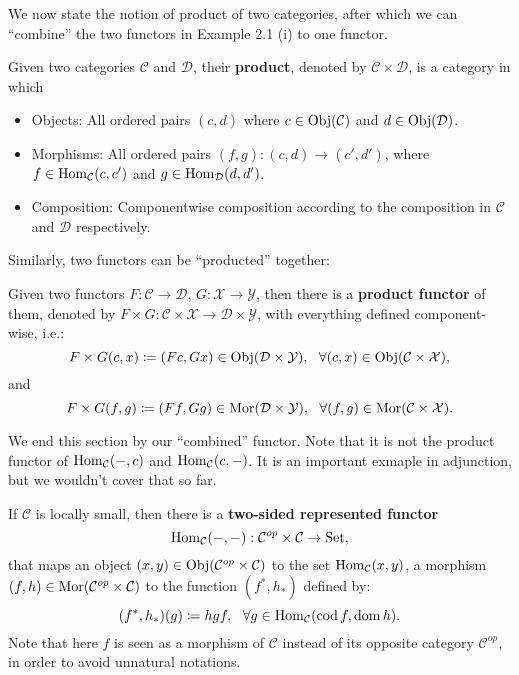 	We now state the notion of product of two categories, after which we can ``combine'' the two functors in Example 2.1 (i) to one functor.
	\begin{definition}
	Given two categories $\mathcal{C}$ and $\mathcal{D}$, their \textbf{product}, denoted by $\mathcal{C}\times\mathcal{D}$, is a category in which
	\begin{itemize}
		\item Objects: All ordered pairs $(c,d)$ where $c\in\operatorname{Obj}(\mathcal{C})$ and $d\in\operatorname{Obj}(\mathcal{D})$.
		\item Morphisms: All ordered pairs $(f,g):(c,d)\to (c',d')$, where $f\in\operatorname{Hom}_\mathcal{C}(c,c')$ and $g\in\operatorname{Hom}_\mathcal{D}(d,d')$.
		\item Composition: Componentwise composition according to the composition in $\mathcal{C}$ and $\mathcal{D}$ respectively.
	\end{itemize}
	\end{definition} 
	Similarly, two functors can be ``producted'' together:
	\begin{definition}
	Given two functors $F:\mathcal{C}\to \mathcal{D}$, $G:\mathcal{X}\to\mathcal{Y}$, then there is a \textbf{product functor} of them, denoted by $F\times G:\mathcal{C}\times\mathcal{X}\to\mathcal{D}\times\mathcal{Y}$, with everything defined component-wise, i.e.:
	\[F\times G(c,x)\coloneqq (Fc,Gx)\in\operatorname{Obj}(\mathcal{D}\times\mathcal{Y}),\ \ \forall (c,x)\in\operatorname{Obj}(\mathcal{C}\times\mathcal{X}),\]
	and 
	\[F\times G(f,g)\coloneqq (Ff,Gg)\in\operatorname{Mor}(\mathcal{D}\times\mathcal{Y}),\ \ \forall (f,g)\in\operatorname{Mor}(\mathcal{C}\times\mathcal{X}).\]
	\end{definition}
	We end this section by our ``combined'' functor. Note that it is not the product functor of $\operatorname{Hom}_\mathcal{C}(-,c)$ and $\operatorname{Hom}_\mathcal{C}(c,-)$. It is an important exmaple in adjunction, but we wouldn't cover that so far.
	\begin{definition}
	If $\mathcal{C}$ is locally small, then there is a \textbf{two-sided represented functor} 
	\[\operatorname{Hom}_\mathcal{C}(-,-):\mathcal{C}^{op}\times \mathcal{C}\to \mathrm{Set},\]
	that maps an object $(x,y)\in\operatorname{Obj}(\mathcal{C}^{op}\times \mathcal{C})$ to the set $\operatorname{Hom}_\mathcal{C}(x,y)$, a morphism $(f,h)\in\operatorname{Mor}(\mathcal{C}^{op}\times \mathcal{C})$ to the function $(f^*,h_*)$ defined by:
	\[(f^*,h_*)(g)\coloneqq hgf,\ \ \forall g\in\Hom_\mathcal{C}(\cod f,\dom h).\]
	Note that here $f$ is seen as a morphism of $\mathcal{C}$ instead of its opposite category $\mathcal{C}^{op}$, in order to avoid unnatural notations.
	\end{definition}